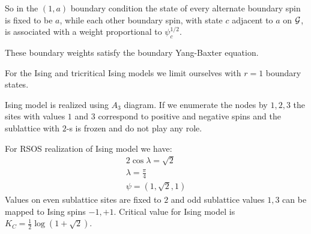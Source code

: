 \documentclass[12pt]{article}
\begin{document}
So in the $(1, a)$ boundary condition the state of every alternate
boundary spin is fixed to be $a$, while each other boundary spin,
with state $c$ adjacent to $a$ on ${\cal G}$, is associated with a
weight proportional to $\psi_c^{1/2}$. 

These boundary weights satisfy the boundary Yang-Baxter equation.

For the Ising and tricritical Ising models we limit ourselves with $r=1$
boundary states. 


Ising model is realized using $A_{3}$ diagram. If we enumerate the nodes by $1,2,3$ the sites with
values $1$ and $3$ correspond to positive and negative spins and the sublattice with $2$-s is frozen
and do not play any role. 

For RSOS realization of Ising model we have:
\begin{eqnarray}
  \label{eq:10}
  2 \cos\lambda = \sqrt{2}\\
  \lambda=\frac{\pi}{4}\\
  \psi = (1,\sqrt{2},1)
\end{eqnarray}
Values on even sublattice sites are fixed to $2$ and odd sublattice
values $1,3$ can be mapped to Ising spins $-1,+1$. Critical value for
Ising model is $K_C=\frac{1}{2}\log (1+\sqrt{2})$.
\end{document}
